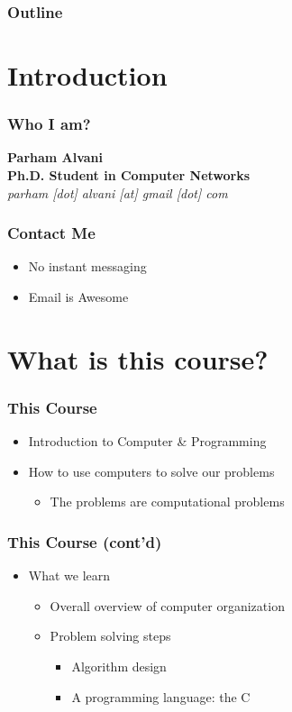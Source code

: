 \documentclass{../c-lecture}
\subtitle{Introduction}
\begin{document}
\begin{frame}
  \titlepage{}
\end{frame}
\begin{frame}
  \frametitle{Outline}
  \tableofcontents{}
\end{frame}

\section{Introduction}

\begin{frame}
  \frametitle{Who I am?}
  \centering
  \textbf{Parham Alvani}\\
  \textbf{Ph.D. Student in Computer Networks}\\
  \vfill
  \textit{parham [dot] alvani [at] gmail [dot] com}
\end{frame}
\begin{frame}
  \frametitle{Contact Me}
  \begin{itemize}
    \item No instant messaging
    \item \color{Orange} Email is Awesome
  \end{itemize}
\end{frame}

\section{What is this course?}

\begin{frame}
  \frametitle{This Course}
  \begin{itemize}
    \item Introduction to Computer \& Programming
    \item How to use computers to solve our problems
    \begin{itemize}
      \item The problems are computational problems
    \end{itemize}
  \end{itemize}
\end{frame}

\begin{frame}
  \frametitle{This Course (cont’d)}
  \begin{itemize}
    \item What we learn
    \begin{itemize}
      \item Overall overview of computer organization
      \item Problem solving steps
      \begin{itemize}
        \item Algorithm design
          \item A programming language: the {\color{Orange} C}
      \end{itemize}
    \end{itemize}
  \end{itemize}
\end{frame}
\end{document}
